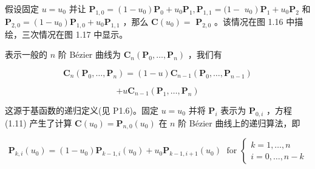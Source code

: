 \documentclass[../main.tex]{subfiles}
\begin{document}
\noindent\begin{minipage}{\linewidth}
假设固定 \(u = {u}_{0}\) 并让 \({\mathbf{P}}_{1,0} = \left( {1 - {u}_{0}}\right) {\mathbf{P}}_{0} + {u}_{0}{\mathbf{P}}_{1},{\mathbf{P}}_{1,1} = (1 -\)  \(\left. {u}_{0}\right) {\mathbf{P}}_{1} + {u}_{0}{\mathbf{P}}_{2}\) 和 \({\mathbf{P}}_{2,0} = \left( {1 - {u}_{0}}\right) {\mathbf{P}}_{1,0} + {u}_{0}{\mathbf{P}}_{1,1}\) ，那么 \(\mathbf{C}\left( {u}_{0}\right)  =\)  \({\mathbf{P}}_{2,0}\) 。该情况在图 1.16 中描绘，三次情况在图 1.17 中显示。

\begin{center}
\begin{minipage}{12cm}
\centering
{}
\captionsetup{font=small,skip=6pt,justification=centering}
\end{minipage}
\end{center}
\end{minipage}
\par\medskip

\noindent\begin{minipage}{\linewidth}
表示一般的 \(n\) 阶 Bézier 曲线为 \({\mathbf{C}}_{n}\left( {{\mathbf{P}}_{0},\ldots ,{\mathbf{P}}_{n}}\right)\) ，我们有

\[
{\mathbf{C}}_{n}\left( {{\mathbf{P}}_{0},\ldots ,{\mathbf{P}}_{n}}\right)  = \left( {1 - u}\right) {\mathbf{C}}_{n - 1}\left( {{\mathbf{P}}_{0},\ldots ,{\mathbf{P}}_{n - 1}}\right)
\]

\[
+ u{\mathbf{C}}_{n - 1}\left( {{\mathbf{P}}_{1},\ldots ,{\mathbf{P}}_{n}}\right)  \tag{1.11}
\]

这源于基函数的递归定义(见 P1.6)。固定 \(u = {u}_{0}\) 并将 \({\mathbf{P}}_{i}\) 表示为 \({\mathbf{P}}_{0,i}\) ，方程 (1.11) 产生了计算 \(\mathbf{C}\left( {u}_{0}\right)  = {\mathbf{P}}_{n,0}\left( {u}_{0}\right)\) 在 \(n\) 阶 Bézier 曲线上的递归算法，即

\[
{\mathbf{P}}_{k,i}\left( {u}_{0}\right)  = \left( {1 - {u}_{0}}\right) {\mathbf{P}}_{k - 1,i}\left( {u}_{0}\right)  + {u}_{0}{\mathbf{P}}_{k - 1,i + 1}\left( {u}_{0}\right) \;\text{ for }\left\{  \begin{array}{l} k = 1,\ldots ,n \\  i = 0,\ldots ,n - k \end{array}\right.  \tag{1.12}
\]

\begin{center}
\begin{minipage}{12cm}
\centering
{}
\captionsetup{font=small,skip=6pt,justification=centering}
\end{minipage}
\end{center}
\end{minipage}
\par\medskip
\end{document}
